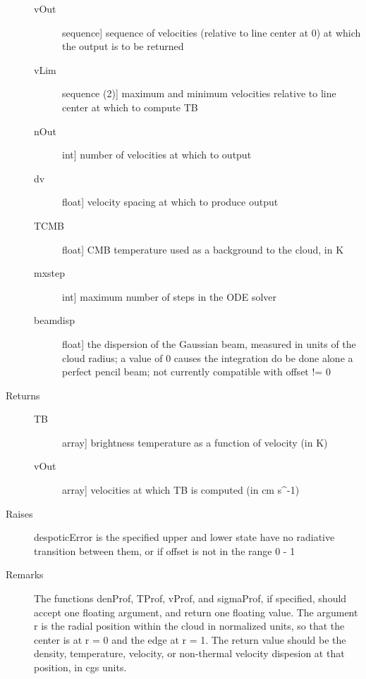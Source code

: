 \documentclass[letterpaper,10pt,english]{sphinxmanual}
\begin{document}
\begin{fulllineitems}
\begin{description}
\begin{description}
\item[{vOut}] \leavevmode{[}sequence{]}
sequence of velocities (relative to line center at 0) at
which the output is to be returned

\item[{vLim}] \leavevmode{[}sequence (2){]}
maximum and minimum velocities relative to line center at
which to compute TB

\item[{nOut}] \leavevmode{[}int{]}
number of velocities at which to output

\item[{dv}] \leavevmode{[}float{]}
velocity spacing at which to produce output

\item[{TCMB}] \leavevmode{[}float{]}
CMB temperature used as a background to the cloud, in K

\item[{mxstep}] \leavevmode{[}int{]}
maximum number of steps in the ODE solver

\item[{beamdisp}] \leavevmode{[}float{]}
the dispersion of the Gaussian beam, measured in units
of the cloud radius; a value of 0 causes the integration do
be done alone a perfect pencil beam; not currently compatible
with offset != 0

\end{description}

\item[{Returns}] \leavevmode\begin{description}
\item[{TB}] \leavevmode{[}array{]}
brightness temperature as a function of velocity (in K)

\item[{vOut}] \leavevmode{[}array{]}
velocities at which TB is computed (in cm s\textasciicircum{}-1)

\end{description}

\item[{Raises}] \leavevmode
despoticError is the specified upper and lower state have no
radiative transition between them, or if offset is not in the
range 0 - 1

\item[{Remarks}] \leavevmode
The functions denProf, TProf, vProf, and sigmaProf, if
specified, should accept one floating argument, and return one
floating value. The argument r is the radial position within
the cloud in normalized units, so that the center is at r = 0
and the edge at r = 1. The return value should be the density,
temperature, velocity, or non-thermal velocity dispesion at
that position, in cgs units.

\end{description}

\end{fulllineitems}
\end{document}
